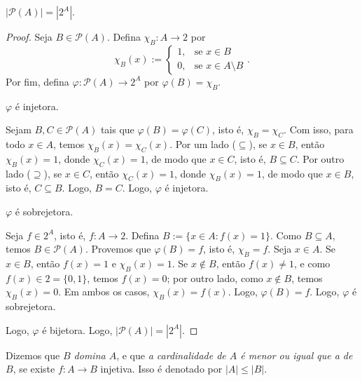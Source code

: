 \begin{theorem}
    $|\mathcal{P}(A)| = |2^A|$.
\end{theorem}

\begin{proof}
    Seja $B \in \mathcal{P}(A)$. Defina $\chi_B : A \to 2$ por
        \[
            \chi_B(x) :=
                \begin{cases}
                    1, & \text{se } x \in B \\
                    0, & \text{se } x \in A \setminus B
                \end{cases}.
        \]
    Por fim, defina $\varphi : \mathcal{P}(A) \to 2^A$ por $\varphi(B) = \chi_B$.
        \begin{claim}
            $\varphi$ é injetora.
        \end{claim}
        \begin{midproof}
            Sejam $B, C \in \mathcal{P}(A)$ tais que $\varphi(B) = \varphi(C)$, isto é, $\chi_B = \chi_C$. Com isso, para todo $x \in A$, temos $\chi_B(x) = \chi_C(x)$. Por um lado ($\subseteq$), se $x \in B$, então $\chi_B(x) = 1$, donde $\chi_C(x) = 1$, de modo que $x \in C$, isto é, $B \subseteq C$. Por outro lado ($\supseteq$), se $x \in C$, então $\chi_C(x) = 1$, donde $\chi_B(x) = 1$, de modo que $x \in B$, isto é, $C \subseteq B$. Logo, $B = C$. Logo, $\varphi$ é injetora. \whiteproof
        \end{midproof}
        \begin{claim}
            $\varphi$ é sobrejetora.
        \end{claim}
        \begin{midproof}
            Seja $f \in 2^A$, isto é, $f : A \to 2$. Defina $B := \{x \in A : f(x) = 1\}$. Como $B \subseteq A$, temos $B \in \mathcal{P}(A)$. Provemos que $\varphi(B) = f$, isto é, $\chi_B = f$. Seja $x \in A$. Se $x \in B$, então $f(x) = 1$ e $\chi_B(x) = 1$. Se $x \notin B$, então $f(x) \neq 1$, e como $f(x) \in 2 = \{0,1\}$, temos $f(x) = 0$; por outro lado, como $x \notin B$, temos $\chi_B(x) = 0$. Em ambos os casos, $\chi_B(x) = f(x)$. Logo, $\varphi(B) = f$. Logo, $\varphi$ é sobrejetora. \whiteproof
        \end{midproof}
    Logo, $\varphi$ é bijetora. Logo, $|\mathcal{P}(A)| = |2^A|$. \blackproof
\end{proof}

\begin{definition}
    Dizemos que \emph{$B$ domina $A$}, e que \emph{a cardinalidade de $A$ é menor ou igual que a de $B$}, se existe $f : A \to B$ injetiva. Isso é denotado por $|A| \leq |B|$.
\end{definition}


